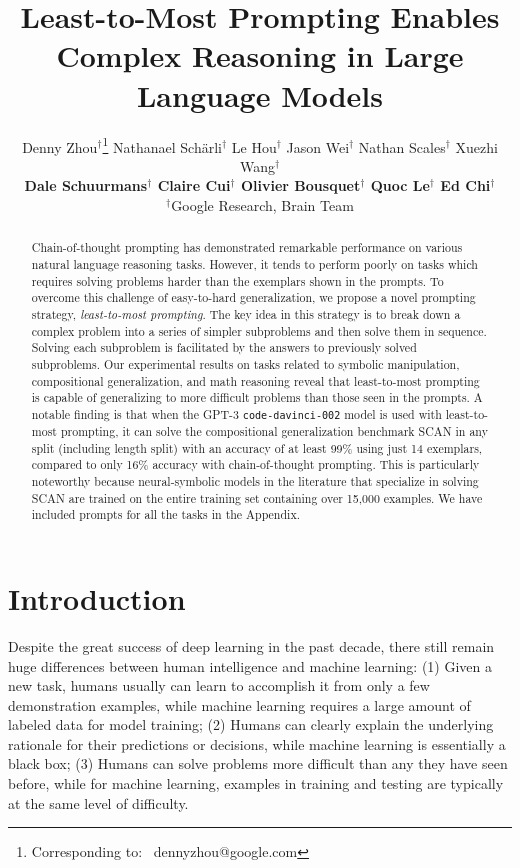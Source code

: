 \documentclass{article}
\title{Least-to-Most Prompting Enables Complex Reasoning in Large Language Models}
\author{%
   Denny Zhou$^\dag$\thanks{Corresponding to: \ dennyzhou@google.com} \quad Nathanael Schärli$^\dag$ \quad Le Hou$^\dag$ \quad Jason Wei$^\dag$ \quad Nathan Scales$^\dag$ \quad
   Xuezhi Wang$^\dag$  \\ \textbf{Dale Schuurmans$^\dag$ \quad Claire Cui$^\dag$ \quad  Olivier Bousquet$^\dag$ \quad  Quoc Le$^\dag$ \quad  Ed Chi$^\dag$}\\
   $^\dag$Google Research, Brain Team \\
}
\begin{document}
\doparttoc %
\faketableofcontents %

\maketitle

\begin{abstract}
Chain-of-thought prompting has demonstrated remarkable performance on various natural language reasoning tasks. However, it tends to perform poorly on tasks which requires solving problems harder than the exemplars shown in the prompts. To overcome this challenge of easy-to-hard generalization, we propose a novel prompting strategy, \emph{least-to-most prompting}. The key idea in this strategy is to break down a complex problem into a series of simpler subproblems and then solve them in sequence. Solving each subproblem is facilitated by the answers to previously solved subproblems. Our experimental results on tasks related to symbolic manipulation, compositional generalization, and math reasoning reveal that least-to-most prompting is capable of generalizing to more difficult problems than those seen in the prompts. A notable finding is that when the GPT-3 \texttt{code-davinci-002} model is used with least-to-most prompting, it can solve the compositional generalization benchmark SCAN in any split (including length split)  with an accuracy of at least 99\% using just 14 exemplars, compared to only 16\% accuracy with chain-of-thought prompting.  This is particularly noteworthy because neural-symbolic models in the literature that specialize in solving SCAN are trained on the entire training set containing over 15,000 examples. We have included prompts for all the tasks in the Appendix.
\end{abstract}

\section{Introduction}
Despite the great success of deep learning in the past decade, there still remain huge differences between human intelligence and machine learning: (1) Given a new task, humans usually can learn to accomplish it from only a few demonstration examples, while machine learning requires a large amount of labeled data for model training; (2) Humans can clearly explain the underlying rationale for their predictions or decisions, while machine learning is essentially a black box;  (3) Humans can solve problems more difficult than any they have seen before, while for machine learning,  examples in training and testing are typically at the same level of difficulty. %
\end{document}
